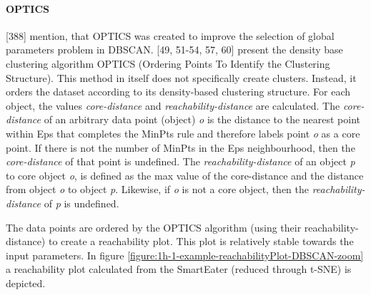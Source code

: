 \paragraph{OPTICS}
\label{section:OPTICS}
\textcite{han2011data}[388] mention, that OPTICS was created to improve the selection of global parameters problem in DBSCAN.
\textcite{OPTICS}[49, 51-54, 57, 60] present the density base clustering algorithm OPTICS (Ordering Points To Identify the Clustering Structure). This method in itself does not specifically create clusters. Instead, it orders the dataset according to its density-based clustering structure. For each object, the values \textit{core-distance} and \textit{reachability-distance} are calculated. The \textit{core-distance} of an arbitrary data point (object) \textit{o} is the distance to the nearest point within Eps that completes the MinPts rule and therefore labels point \textit{o} as a core point. If there is not the number of MinPts in the Eps neighbourhood, then the \textit{core-distance} of that point is undefined. The \textit{reachability-distance} of an object \textit{p} to core object \textit{o}, is defined as the max value of the core-distance and the distance from object \textit{o} to object \textit{p}. Likewise, if \textit{o} is not a core object, then the \textit{reachability-distance} of \textit{p} is undefined. 




The data points are ordered by the OPTICS algorithm (using their reachability-distance) to create a reachability plot. This plot is relatively stable towards the input parameters. In figure \ref{figure:1h-1-example-reachabilityPlot-DBSCAN-zoom} a reachability plot calculated from the SmartEater (reduced through t-SNE) is depicted. 



